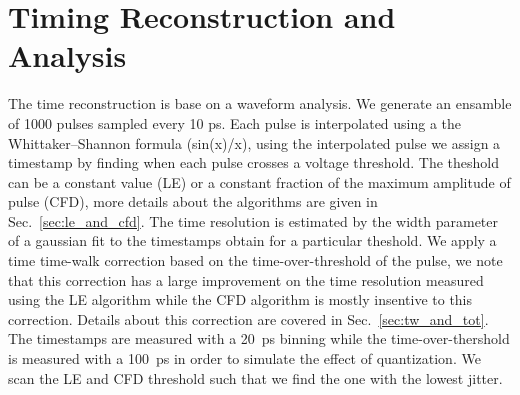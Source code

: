 \documentclass[preprint,1p]{elsarticle}
\begin{document}
\section{Timing Reconstruction and Analysis}\label{sec:timing_and_analysis}
The time reconstruction is base on a waveform analysis. We generate an ensamble of 1000 pulses sampled every 10 ps.
Each pulse is interpolated using a the Whittaker–Shannon formula (sin(x)/x), using the interpolated pulse we assign a timestamp by finding when each pulse crosses
a voltage threshold. The theshold can be a constant value (LE) or a constant fraction of the maximum amplitude of pulse (CFD), more details
about the algorithms are given in Sec.~\ref{sec:le_and_cfd}. The time resolution is estimated by the width parameter of a gaussian fit
to the timestamps obtain for a particular theshold. We apply a time time-walk correction based on the time-over-threshold of the pulse,
we note that this correction has a large improvement on the time resolution measured using the LE algorithm while the CFD algorithm is mostly
insentive to this correction. Details about this correction are covered in Sec.~\ref{sec:tw_and_tot}. The timestamps are measured with a
20~\si{ps} binning while the time-over-thershold is measured with a 100~\si{ps} in order to simulate the effect of quantization. We scan
the LE and CFD threshold such that we find the one with the lowest jitter.
\end{document}

